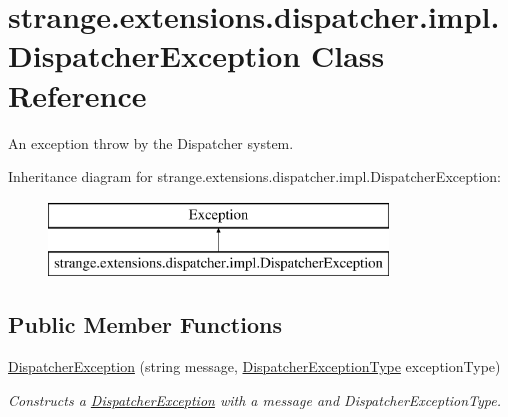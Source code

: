 \hypertarget{classstrange_1_1extensions_1_1dispatcher_1_1impl_1_1_dispatcher_exception}{\section{strange.\-extensions.\-dispatcher.\-impl.\-Dispatcher\-Exception Class Reference}
\label{classstrange_1_1extensions_1_1dispatcher_1_1impl_1_1_dispatcher_exception}
}


An exception throw by the Dispatcher system.  


Inheritance diagram for strange.\-extensions.\-dispatcher.\-impl.\-Dispatcher\-Exception\-:\begin{figure}[H]
\begin{center}
\leavevmode
\includegraphics[height=2.000000cm]{classstrange_1_1extensions_1_1dispatcher_1_1impl_1_1_dispatcher_exception}
\end{center}
\end{figure}
\subsection*{Public Member Functions}
\begin{DoxyCompactItemize}
\item 
\hypertarget{classstrange_1_1extensions_1_1dispatcher_1_1impl_1_1_dispatcher_exception_a4e1966d8a7ae6caf398689c29fd06b98}{\hyperlink{classstrange_1_1extensions_1_1dispatcher_1_1impl_1_1_dispatcher_exception_a4e1966d8a7ae6caf398689c29fd06b98}{Dispatcher\-Exception} (string message, \hyperlink{namespacestrange_1_1extensions_1_1dispatcher_1_1api_a03ba459ad62cc042c88405d9419eb4c6}{Dispatcher\-Exception\-Type} exception\-Type)}\label{classstrange_1_1extensions_1_1dispatcher_1_1impl_1_1_dispatcher_exception_a4e1966d8a7ae6caf398689c29fd06b98}

\begin{DoxyCompactList}\small\item\em Constructs a \hyperlink{classstrange_1_1extensions_1_1dispatcher_1_1impl_1_1_dispatcher_exception}{Dispatcher\-Exception} with a message and Dispatcher\-Exception\-Type. \end{DoxyCompactList}\end{DoxyCompactItemize}

